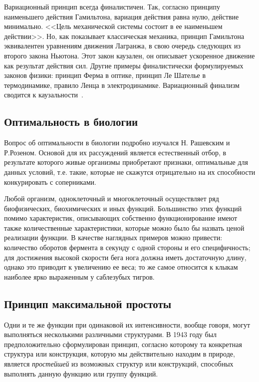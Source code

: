 \documentclass[12pt,a4paper,oneside]{book}
\begin{document}
Вариационный принцип всегда финалистичен. Так, согласно принципу наименьшего действия Гамильтона, вариация действия равна нулю, действие минимально. <<Цель механической системы состоит в ее наименьшем действии>>. Но, как показывает классическая механика, принцип Гамильтона эквивалентен уравнениям движения Лагранжа, в свою очередь следующих из второго закона Ньютона. Этот закон каузален, он описывает ускоренное движение как результат действия сил. Другие примеры финалистически формулируемых законов физики: принцип Ферма в оптике, принцип Ле Шателье в термодинамике, правило Ленца в электродинамике. Вариационный финализм сводится к каузальности~\cite{Volkenshtejn1988}.


\subsection{Оптимальность в биологии}

Вопрос об оптимальности в биологии подробно изучался Н. Рашевским и Р.Розеном. Основой для их рассуждений является естественный отбор, в результате которого живые организмы приобретают признаки, оптимальные для данных условий, т.е. такие, которые не скажутся отрицательно на их способности конкурировать с соперниками. 

Любой организм, одноклеточный и многоклеточный осуществляет ряд биофизических, биохимических и иных функций. Большинство этих функций помимо характеристик, описывающих собственно функционирование имеют также количественные характеристики, которые можно было бы назвать ценой реализации функции. В качестве наглядных примеров можно привести: 
количество оборотов фермента в секунду с одной стороны и его специфичность; 
для достижения высокой скорости бега нога должна иметь достаточную длину, однако это приводит к увеличению ее веса; то же самое относится к клыкам наиболее ярко выраженным у саблезубых тигров.


\subsection{Принцип максимальной простоты}

Одни и те же функции при одинаковой их интенсивности, вообще говоря, могут выполняться несколькими различными структурами. В 1943 году был предположительно сформулирован принцип, согласно которому та конкретная структура или конструкция, которую мы действительно находим в природе, является {\it простейшей} из возможных структур или конструкций, способных выполнять данную функцию или группу функций.
\end{document}
